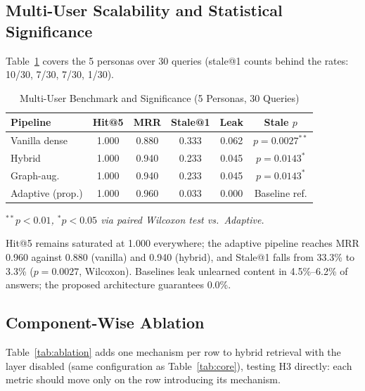 \documentclass[conference]{IEEEtran}
\begin{document}
\subsection{Multi-User Scalability and Statistical Significance}
Table~\ref{tab:multi} covers the 5 personas over 30 queries (stale@1 counts behind the rates: 10/30, 7/30, 7/30, 1/30).

\begin{table}[htbp]
\caption{Multi-User Benchmark and Significance (5 Personas, 30 Queries)}
\label{tab:multi}
\centering
\scriptsize
\begin{tabular}{|l|c|c|c|c|c|}
\hline
\textbf{Pipeline} & \textbf{Hit@5} & \textbf{MRR} & \textbf{Stale@1} & \textbf{Leak} & \textbf{Stale $p$} \\
\hline
Vanilla dense & 1.000 & 0.880 & 0.333 & 0.062 & $p = 0.0027^{**}$ \\
\hline
Hybrid & 1.000 & 0.940 & 0.233 & 0.045 & $p = 0.0143^{*}$ \\
\hline
Graph-aug. & 1.000 & 0.940 & 0.233 & 0.045 & $p = 0.0143^{*}$ \\
\hline
Adaptive (prop.) & 1.000 & 0.960 & 0.033 & 0.000 & Baseline ref. \\
\hline
\end{tabular}
\vspace{0.5mm}

{\scriptsize\itshape $^{**}p < 0.01$, $^{*}p < 0.05$ via paired Wilcoxon test vs.\ Adaptive.}
\end{table}

Hit@5 remains saturated at 1.000 everywhere; the adaptive pipeline reaches MRR 0.960 against 0.880 (vanilla) and 0.940 (hybrid), and Stale@1 falls from 33.3\% to 3.3\% ($p = 0.0027$, Wilcoxon). Baselines leak unlearned content in 4.5\%--6.2\% of answers; the proposed architecture guarantees 0.0\%.

\subsection{Component-Wise Ablation}
\label{sec:ablation}
Table~\ref{tab:ablation} adds one mechanism per row to hybrid retrieval with the layer disabled (same configuration as Table~\ref{tab:core}), testing H3 directly: each metric should move only on the row introducing its mechanism.
\end{document}
